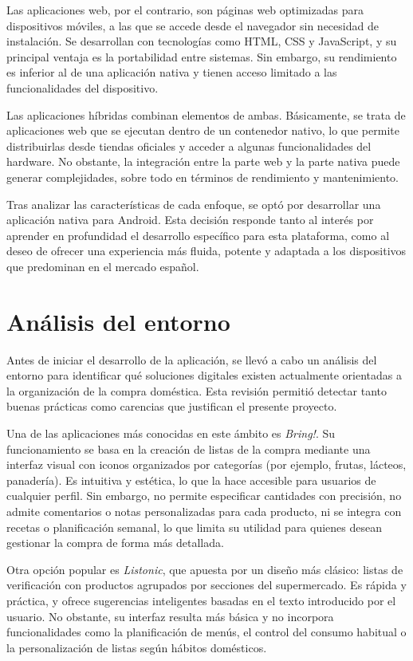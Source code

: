 Las aplicaciones web, por el contrario, son páginas web optimizadas para dispositivos móviles, a las que se accede desde el navegador sin necesidad de instalación. Se desarrollan con tecnologías como HTML, CSS y JavaScript, y su principal ventaja es la portabilidad entre sistemas. Sin embargo, su rendimiento es inferior al de una aplicación nativa y tienen acceso limitado a las funcionalidades del dispositivo.

Las aplicaciones híbridas combinan elementos de ambas. Básicamente, se trata de aplicaciones web que se ejecutan dentro de un contenedor nativo, lo que permite distribuirlas desde tiendas oficiales y acceder a algunas funcionalidades del hardware. No obstante, la integración entre la parte web y la parte nativa puede generar complejidades, sobre todo en términos de rendimiento y mantenimiento.

Tras analizar las características de cada enfoque, se optó por desarrollar una aplicación nativa para Android. Esta decisión responde tanto al interés por aprender en profundidad el desarrollo específico para esta plataforma, como al deseo de ofrecer una experiencia más fluida, potente y adaptada a los dispositivos que predominan en el mercado español.

\section{Análisis del entorno}

Antes de iniciar el desarrollo de la aplicación, se llevó a cabo un análisis del entorno para identificar qué soluciones digitales existen actualmente orientadas a la organización de la compra doméstica. Esta revisión permitió detectar tanto buenas prácticas como carencias que justifican el presente proyecto.

Una de las aplicaciones más conocidas en este ámbito es \textit{Bring!}. Su funcionamiento se basa en la creación de listas de la compra mediante una interfaz visual con iconos organizados por categorías (por ejemplo, frutas, lácteos, panadería). Es intuitiva y estética, lo que la hace accesible para usuarios de cualquier perfil. Sin embargo, no permite especificar cantidades con precisión, no admite comentarios o notas personalizadas para cada producto, ni se integra con recetas o planificación semanal, lo que limita su utilidad para quienes desean gestionar la compra de forma más detallada.

Otra opción popular es \textit{Listonic}, que apuesta por un diseño más clásico: listas de verificación con productos agrupados por secciones del supermercado. Es rápida y práctica, y ofrece sugerencias inteligentes basadas en el texto introducido por el usuario. No obstante, su interfaz resulta más básica y no incorpora funcionalidades como la planificación de menús, el control del consumo habitual o la personalización de listas según hábitos domésticos.

